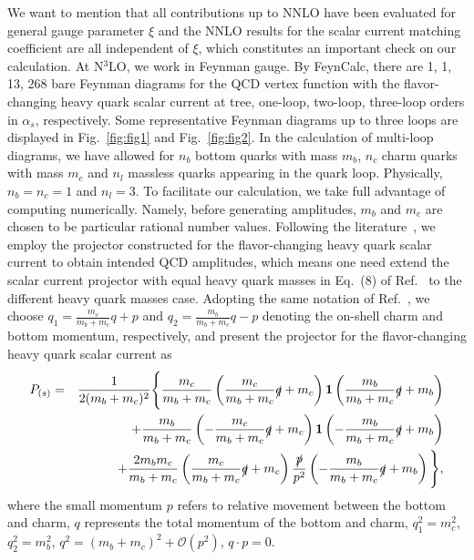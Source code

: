\documentclass[onecolumn,preprintnumbers,aps,superscriptaddress,nofootinbib,prd,notitlepage]{revtex4-1}
\newcommand{\beq}{\begin{eqnarray}}
\newcommand{\eeq}{\end{eqnarray}}
\newcommand{\non}{\nonumber\\ }
\begin{document}
{We want to mention that all contributions up to NNLO have been evaluated for general gauge parameter $\xi$ and the NNLO results for the scalar current matching coefficient are all independent of $\xi$,
which constitutes an important check on our calculation.
At N$^3$LO, we work in Feynman gauge. By FeynCalc, there are 1, 1, 13, 268 bare Feynman diagrams for the QCD vertex function with the flavor-changing heavy quark scalar current at tree, one-loop, two-loop, three-loop orders in $\alpha_s$, respectively.
Some representative Feynman diagrams up to  three loops  are displayed in Fig.~\ref{fig:fig1} and Fig.~\ref{fig:fig2}.
In the calculation of multi-loop diagrams, we have allowed for $n_b$ bottom quarks with mass $m_b$, $n_c$ charm quarks  with mass $m_c$ and $n_l$ massless quarks appearing in the quark loop.
Physically,  $n_b=n_c=1$ and $n_l=3$.
To facilitate our calculation, we take full advantage of computing numerically. Namely, before generating amplitudes, $m_b$ and $m_c$ are chosen
to be particular rational number values\cite{Bronnum-Hansen:2021olh,Chen:2022vzo,Chen:2022mre}.
Following the literature~\cite{Kniehl:2006qw}, we employ the projector constructed for the flavor-changing heavy quark scalar current to obtain intended QCD amplitudes,
which means one need extend the scalar current projector with equal heavy quark masses in Eq.~(8) of Ref.~\cite{Kniehl:2006qw} to the different heavy quark masses case.
Adopting the same notation of Ref.~\cite{Kniehl:2006qw}, we choose $q_1=\frac{m_c}{m_b+m_c}q+p$ and $q_2=\frac{m_b}{m_b+m_c}q-p$ denoting the on-shell charm and bottom momentum, respectively,
and present the projector for the flavor-changing heavy quark scalar current as
\beq
P_{(s)} &=& \frac{1}{2(m_b+m_c)^2} \Bigg\{ \frac{m_c}{m_b+m_c}\left(\frac{m_c}{m_b+m_c}\slashed{q} + m_c \right) {\bf 1} \left(\frac{m_b}{m_b+m_c}\slashed{q} + m_b\right) \non
          && +\frac{m_b}{m_b+m_c}\left(-\frac{m_c}{m_b+m_c}\slashed{q} + m_c \right) {\bf 1} \left(-\frac{m_b}{m_b+m_c}\slashed{q} + m_b\right) \non
          &&  +\frac{2 m_b m_c}{m_b+m_c} \left(\frac{m_c}{m_b+m_c}\slashed{q} + m_c\right) \frac{\slashed{p}}{p^2} \left(-\frac{m_b}{m_b+m_c}\slashed{q} + m_b\right) \Bigg\},
\eeq
where the small momentum $p$ refers to  relative movement  between the bottom and charm, $q$ represents the total momentum of the bottom and charm, $q_1^2=m_c^2$, $q_2^2=m_b^2$, $q^2=(m_b+m_c)^2+\mathcal{O}{(p^2)}$, $q\cdot p=0$.

}
\end{document}

